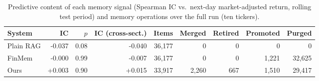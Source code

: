 \begin{table}[ht]
\centering
\caption{Predictive content of each memory signal (Spearman IC vs.\ next-day market-adjusted return, rolling test period) and memory operations over the full run (ten tickers).}
\label{tab:icops}
\small
\begin{tabular}{lrrrrrrrr}
\hline
System & IC & $p$ & IC (cross-sect.) & Items & Merged & Retired & Promoted & Purged \\
\hline
Plain RAG & -0.037 & 0.08 & -0.040 & 36,177 & 0 & 0 & 0 & 0 \\
FinMem & -0.000 & 0.99 & -0.007 & 36,177 & 0 & 0 & 1,221 & 32,625 \\
Ours & +0.003 & 0.90 & +0.015 & 33,917 & 2,260 & 667 & 1,510 & 29,417 \\
\hline
\end{tabular}
\end{table}
